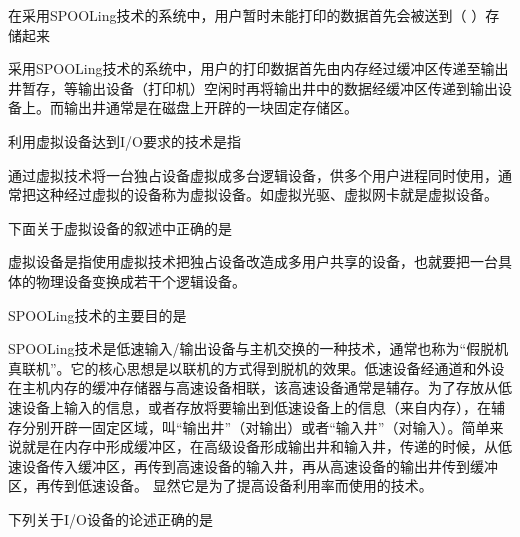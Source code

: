 \question 在采用SPOOLing技术的系统中，用户暂时未能打印的数据首先会被送到（
）存储起来
\par{}
\begin{solution}采用SPOOLing技术的系统中，用户的打印数据首先由内存经过缓冲区传递至输出井暂存，等输出设备（打印机）空闲时再将输出井中的数据经缓冲区传递到输出设备上。而输出井通常是在磁盘上开辟的一块固定存储区。
\end{solution}
\question 利用虚拟设备达到I/O要求的技术是指
\par{}
\begin{solution}通过虚拟技术将一台独占设备虚拟成多台逻辑设备，供多个用户进程同时使用，通常把这种经过虚拟的设备称为虚拟设备。如虚拟光驱、虚拟网卡就是虚拟设备。
\end{solution}
\question 下面关于虚拟设备的叙述中正确的是
\par{}
\begin{solution}虚拟设备是指使用虚拟技术把独占设备改造成多用户共享的设备，也就要把一台具体的物理设备变换成若干个逻辑设备。
\end{solution}
\question SPOOLing技术的主要目的是
\par{}
\begin{solution}SPOOLing技术是低速输入/输出设备与主机交换的一种技术，通常也称为``假脱机真联机''。它的核心思想是以联机的方式得到脱机的效果。低速设备经通道和外设在主机内存的缓冲存储器与高速设备相联，该高速设备通常是辅存。为了存放从低速设备上输入的信息，或者存放将要输出到低速设备上的信息（来自内存），在辅存分别开辟一固定区域，叫``输出井''（对输出）或者``输入井''（对输入）。简单来说就是在内存中形成缓冲区，在高级设备形成输出井和输入井，传递的时候，从低速设备传入缓冲区，再传到高速设备的输入井，再从高速设备的输出井传到缓冲区，再传到低速设备。
显然它是为了提高设备利用率而使用的技术。
\end{solution}
\question 下列关于I/O设备的论述正确的是
\par{}
